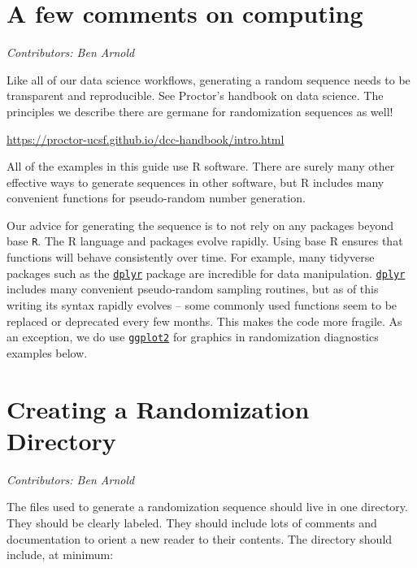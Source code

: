 \documentclass[
]{book}
\begin{document}
\hypertarget{computing}{%
\chapter{A few comments on computing}\label{computing}}

\emph{Contributors: Ben Arnold}

Like all of our data science workflows, generating a random sequence needs to be transparent and reproducible. See Proctor's handbook on data science. The principles we describe there are germane for randomization sequences as well!

\url{https://proctor-ucsf.github.io/dcc-handbook/intro.html}

All of the examples in this guide use R software. There are surely many other effective ways to generate sequences in other software, but R includes many convenient functions for pseudo-random number generation.

Our advice for generating the sequence is to not rely on any packages beyond base \texttt{R}. The R language and packages evolve rapidly. Using base R ensures that functions will behave consistently over time. For example, many tidyverse packages such as the \href{https://dplyr.tidyverse.org/}{\texttt{dplyr}} package are incredible for data manipulation. \href{https://dplyr.tidyverse.org/}{\texttt{dplyr}} includes many convenient pseudo-random sampling routines, but as of this writing its syntax rapidly evolves -- some commonly used functions seem to be replaced or deprecated every few months. This makes the code more fragile. As an exception, we do use \href{https://ggplot2.tidyverse.org/}{\texttt{ggplot2}} for graphics in randomization diagnostics examples below.

\hypertarget{directory}{%
\chapter{Creating a Randomization Directory}\label{directory}}

\emph{Contributors: Ben Arnold}

The files used to generate a randomization sequence should live in one directory. They should be clearly labeled. They should include lots of comments and documentation to orient a new reader to their contents. The directory should include, at minimum:
\end{document}
